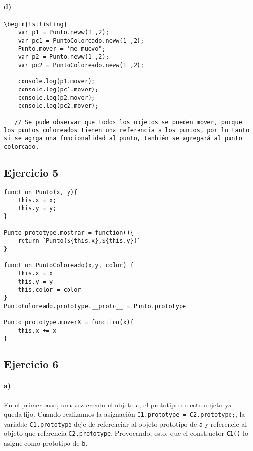 \documentclass[10pt,a4paper]{article}
\begin{document}
\paragraph{d)}
\begin{centrado}
\begin{verbatim}
\begin{lstlisting}
    var p1 = Punto.neww(1 ,2);
    var pc1 = PuntoColoreado.neww(1 ,2);
    Punto.mover = "me muevo";
    var p2 = Punto.neww(1 ,2);
    var pc2 = PuntoColoreado.neww(1 ,2);

    console.log(p1.mover);
    console.log(pc1.mover);
    console.log(p2.mover);
    console.log(pc2.mover);

   // Se pude observar que todos los objetos se pueden mover, porque los puntos coloreados tienen una referencia a los puntos, por lo tanto si se agrga una funcionalidad al punto, tanbién se agregará al punto coloreado.
\end{verbatim}
\end{centrado}
  
\subsection{Ejercicio 5}
\begin{centrado}
\begin{verbatim}
function Punto(x, y){
    this.x = x;
    this.y = y;
}

Punto.prototype.mostrar = function(){
    return `Punto(${this.x},${this.y})`
}

function PuntoColoreado(x,y, color) {
    this.x = x
    this.y = y
    this.color = color
}
PuntoColoreado.prototype.__proto__ = Punto.prototype

Punto.prototype.moverX = function(x){
    this.x += x
}
\end{verbatim}
\end{centrado}

\subsection{Ejercicio 6}
\paragraph{a)} En el primer caso, una vez creado el objeto a, el prototipo de este objeto ya queda fijo. Cuando realizamos la asignación \texttt{C1.prototype = C2.prototype;}, la variable \texttt{C1.prototype} deje de referenciar al objeto prototipo de \texttt{a} y referencie al objeto que referencia \texttt{C2.prototype}. Provocando, esto, que el constructor \texttt{C1()} lo asigne como prototipo de \texttt{b}.
\end{document}
